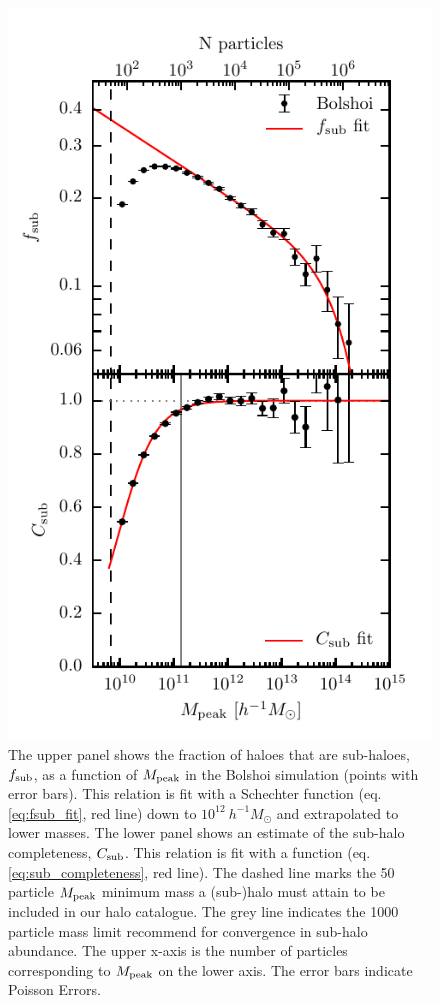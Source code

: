 \documentclass[a4paper,fleqn,usenatbib]{mnras}
\begin{document}
\begin{figure}
    \includegraphics{figures/sub_fraction_and_completeness.pdf}
    \caption{The upper panel shows the fraction of haloes that are sub-haloes, $f_{\rm sub}$, as a function of $M_{\rm peak}$ in the Bolshoi simulation (points with error bars).  This relation is fit with a Schechter function (eq. \ref{eq:fsub_fit}, red line) down to $10^{12} ~ h^{-1}M_{\odot}$ and extrapolated to lower masses.  The lower panel shows an estimate of the sub-halo completeness, $C_{\rm sub}$.  This relation is fit with a function (eq. \ref{eq:sub_completeness}, red line).   The dashed line marks the 50 particle $M_{\rm peak}$ minimum mass a (sub-)halo must attain to be included in our halo catalogue.  The grey line indicates the 1000 particle mass limit \citet{Guo:2013fm} recommend for convergence in sub-halo abundance.  The upper x-axis is the number of particles corresponding to $M_{\rm peak}$ on the lower axis.  The error bars indicate Poisson Errors.}
    \label{fig:f_sub}
\end{figure}
\end{document}
